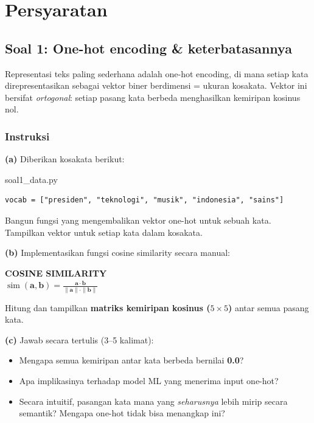 \documentclass[12pt, a4paper]{article}
\begin{document}
\section{Persyaratan}\label{sec:requirements}

\subsection{Soal 1: One-hot encoding \& keterbatasannya}
\label{sec:soal1}

Representasi teks paling sederhana adalah one-hot encoding, di mana setiap kata direpresentasikan sebagai vektor biner berdimensi = ukuran kosakata. Vektor ini bersifat \emph{ortogonal}: setiap pasang kata berbeda menghasilkan kemiripan kosinus nol.

\subsubsection{Instruksi}
\label{sec:soal1-instruksi}

\textbf{(a)} Diberikan kosakata berikut:

\begin{codewindow}{soal1\_data.py}
\begin{lstlisting}[style=pycode]
vocab = ["presiden", "teknologi", "musik", "indonesia", "sains"]
\end{lstlisting}
\end{codewindow}

Bangun fungsi  yang mengembalikan vektor one-hot untuk sebuah kata. Tampilkan vektor untuk setiap kata dalam kosakata.

\textbf{(b)} Implementasikan fungsi cosine similarity secara manual:

\begin{center}
\colorbox{ctpBase}{%
  \parbox{0.75\linewidth}{\centering
    \footnotesize\bfseries\color{ctpOverlay}\MakeUppercase{Cosine Similarity}\\[6pt]
    {\large\color{ctpBlue}$\displaystyle\operatorname{sim}(\mathbf{a}, \mathbf{b}) = \frac{\mathbf{a} \cdot \mathbf{b}}{\|\mathbf{a}\| \cdot \|\mathbf{b}\|}$}}}
\end{center}

Hitung dan tampilkan \textbf{matriks kemiripan kosinus ($5 \times 5$)} antar semua pasang kata.

\textbf{(c)} Jawab secara tertulis (3--5 kalimat):
\begin{itemize}
  \item Mengapa semua kemiripan antar kata berbeda bernilai \textbf{0.0}?
  \item Apa implikasinya terhadap model ML yang menerima input one-hot?
  \item Secara intuitif, pasangan kata mana yang \emph{seharusnya} lebih mirip secara semantik? Mengapa one-hot tidak bisa menangkap ini?
\end{itemize}
\end{document}
